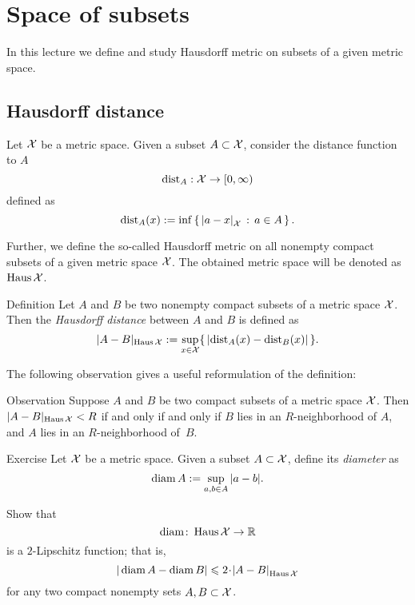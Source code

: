 \chapter{Space of subsets}\label{chap:hausdorff}

In this lecture we define and study Hausdorff metric on subsets of a given metric space.

\section{Hausdorff distance}

Let $\mathcal{X}$ be a metric space.
Given a subset $A\subset \mathcal{X}$,
consider the distance function to $A$
$$\mathrm{dist}_A: \mathcal{X} \to [0,\infty)$$
defined as 
$$\distfun_A(x)
\df
\inf\set{\dist ax{\spc{X}}}{a\in A}.$$

Further, we define the so-called Hausdorff metric on all nonempty compact subsets of a given metric space $\mathcal{X}$.
The obtained metric space will be denoted as $\operatorname{\rm Haus}\nolimits\mathcal{X}$.

\begin{thm}{Definition}\label{def:hausdorff-convergence}
Let $A$ and $B$ be two nonempty compact subsets of a metric space $\mathcal{X}$.
Then the \emph{Hausdorff distance} between $A$ and $B$ is defined as 
$$|A-B|_{\operatorname{\rm Haus}\nolimits\mathcal{X}}
\mathrel{:=}
\sup_{x\in \mathcal{X}}\{\,|\mathrm{dist}_A(x)-\mathrm{dist}_B(x)|\,\}.
$$

\end{thm}

The following observation gives a useful reformulation of the definition:

\begin{thm}{Observation}\label{obs:Haus-nbhds}
Suppose $A$ and $B$ be two compact subsets of a metric space $\mathcal{X}$.
Then $|A-B|_{\operatorname{\rm Haus}\nolimits\mathcal{X}}< R$ if and only if and only if 
$B$ lies in an $R$-neighborhood of $A$, 
and 
$A$ lies in an $R$-neighborhood of~$B$.
\end{thm}

\begin{thm}{Exercise}\label{ex:diam}
Let $\mathcal{X}$ be a metric space.
Given a subset $A\subset \mathcal{X}$, define its \emph{diameter} as 
$$\operatorname{\rm diam}\nolimits A\mathrel{:=}\sup_{a,b\in A} |a-b|.$$

Show that 
$$\operatorname{\rm diam}\nolimits\colon\operatorname{\rm Haus}\nolimits\mathcal{X}\to \mathbb{R}$$ 
is a $2$-Lipschitz function;
that is,
\[|\diam A-\diam B|\le 2\cdot\dist{A}{B}{\Haus\spc{X}}\]
for any two compact nonempty sets $A,B\subset\mathcal{X}$.
\end{thm}


